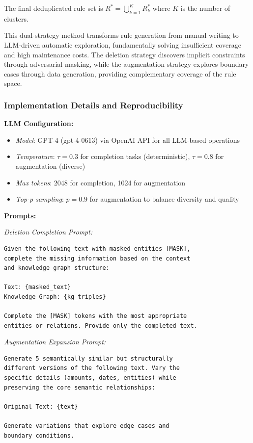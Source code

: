 \documentclass[runningheads]{llncs}
\begin{document}
The final deduplicated rule set is $R^* = \bigcup_{k=1}^{K} R_k^*$ where $K$ is the number of clusters.

This dual-strategy method transforms rule generation from manual writing to LLM-driven automatic exploration, fundamentally solving insufficient coverage and high maintenance costs. The deletion strategy discovers implicit constraints through adversarial masking, while the augmentation strategy explores boundary cases through data generation, providing complementary coverage of the rule space.

\subsubsection{Implementation Details and Reproducibility}

\textbf{LLM Configuration:}
\begin{itemize}
    \item \textit{Model}: GPT-4 (gpt-4-0613) via OpenAI API for all LLM-based operations
    \item \textit{Temperature}: $\tau = 0.3$ for completion tasks (deterministic), $\tau = 0.8$ for augmentation (diverse)
    \item \textit{Max tokens}: 2048 for completion, 1024 for augmentation
    \item \textit{Top-p sampling}: $p = 0.9$ for augmentation to balance diversity and quality
\end{itemize}

\textbf{Prompts:}

\textit{Deletion Completion Prompt:}
\begin{verbatim}
Given the following text with masked entities [MASK],
complete the missing information based on the context
and knowledge graph structure:

Text: {masked_text}
Knowledge Graph: {kg_triples}

Complete the [MASK] tokens with the most appropriate
entities or relations. Provide only the completed text.
\end{verbatim}

\textit{Augmentation Expansion Prompt:}
\begin{verbatim}
Generate 5 semantically similar but structurally
different versions of the following text. Vary the
specific details (amounts, dates, entities) while
preserving the core semantic relationships:

Original Text: {text}

Generate variations that explore edge cases and
boundary conditions.
\end{verbatim}
\end{document}
